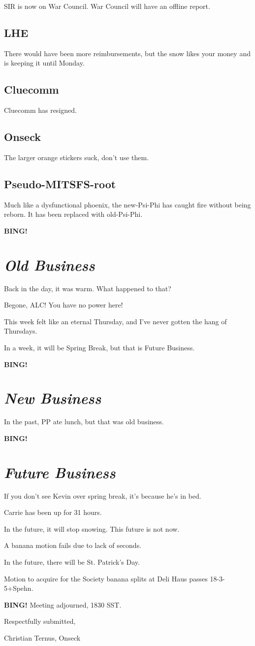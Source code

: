 \documentclass[10pt]{article}
\newcommand{\bing}{{\bf BING!} }
\newcommand{\goto}[1]{\bing \vskip 12pt \section*{{\em{#1}}}}
\begin{document}
SIR is now on War Council.  War Council will have an offline report.

\subsection*{LHE}

There would have been more reimbursements, but the snow likes your money and is keeping it until Monday.

\subsection*{Cluecomm}

Cluecomm has resigned.

\subsection*{Onseck}

The larger orange stickers suck, don't use them.

\subsection*{Pseudo-MITSFS-root}

Much like a dysfunctional phoenix, the new-Psi-Phi has caught fire without being reborn.  It has
been replaced with old-Psi-Phi.

\goto{Old Business}

Back in the day, it was warm.  What happened to that?

Begone, ALC!  You have no power here!

This week felt like an eternal Thursday, and I've never gotten the hang of Thursdays.

In a week, it will be Spring Break, but that is Future Business.

\goto{New Business}

In the past, PP ate lunch, but that was old business.

\goto{Future Business}

If you don't see Kevin over spring break, it's because he's in bed.

Carrie has been up for 31 hours.

In the future, it will stop snowing.  This future is not now.

A banana motion fails due to lack of seconds.

In the future, there will be St. Patrick's Day.

Motion to acquire for the Society banana splits at Deli Haus passes 18-3-5+Spehn.

\bing
\noindent
Meeting adjourned, 1830 SST.

\vspace{18pt}

\centerline{Respectfully submitted,}
\centerline{Christian Ternus, Onseck}
\end{document}

